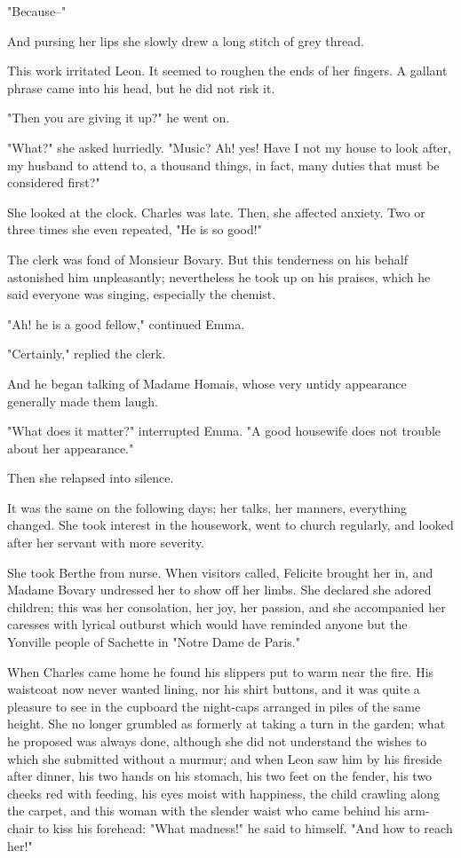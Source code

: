\documentclass{tufte-book}
\begin{document}
"Because--"

And pursing her lips she slowly drew a long stitch of grey thread.

This work irritated Leon. It seemed to roughen the ends of her fingers.
A gallant phrase came into his head, but he did not risk it.

"Then you are giving it up?" he went on.

"What?" she asked hurriedly. "Music? Ah! yes! Have I not my house to
look after, my husband to attend to, a thousand things, in fact, many
duties that must be considered first?"

She looked at the clock. Charles was late. Then, she affected anxiety.
Two or three times she even repeated, "He is so good!"

The clerk was fond of Monsieur Bovary. But this tenderness on his behalf
astonished him unpleasantly; nevertheless he took up on his praises,
which he said everyone was singing, especially the chemist.

"Ah! he is a good fellow," continued Emma.

"Certainly," replied the clerk.

And he began talking of Madame Homais, whose very untidy appearance
generally made them laugh.

"What does it matter?" interrupted Emma. "A good housewife does not
trouble about her appearance."

Then she relapsed into silence.

It was the same on the following days; her talks, her manners,
everything changed. She took interest in the housework, went to church
regularly, and looked after her servant with more severity.

She took Berthe from nurse. When visitors called, Felicite brought her
in, and Madame Bovary undressed her to show off her limbs. She declared
she adored children; this was her consolation, her joy, her passion,
and she accompanied her caresses with lyrical outburst which would have
reminded anyone but the Yonville people of Sachette in "Notre Dame de
Paris."

When Charles came home he found his slippers put to warm near the fire.
His waistcoat now never wanted lining, nor his shirt buttons, and it was
quite a pleasure to see in the cupboard the night-caps arranged in piles
of the same height. She no longer grumbled as formerly at taking a turn
in the garden; what he proposed was always done, although she did not
understand the wishes to which she submitted without a murmur; and when
Leon saw him by his fireside after dinner, his two hands on his stomach,
his two feet on the fender, his two cheeks red with feeding, his eyes
moist with happiness, the child crawling along the carpet, and this
woman with the slender waist who came behind his arm-chair to kiss his
forehead: "What madness!" he said to himself. "And how to reach her!"
\end{document}
